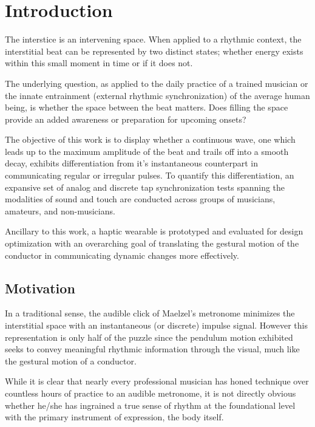 
\chapter{Introduction} \label{secIntro}
The interstice is an intervening space. When applied to a rhythmic context, the interstitial beat can be represented by two distinct states; whether energy exists within this small moment in time or if it does not. 

The underlying question, as applied to the daily practice of a trained musician or the innate entrainment (external rhythmic synchronization) of the average human being, is whether the space between the beat matters. Does filling the space provide an added awareness or preparation for upcoming onsets?

The objective of this work is to display whether a continuous wave, one which leads up to the maximum amplitude of the beat and trails off into a smooth decay, exhibits differentiation from it's instantaneous counterpart in communicating regular or irregular pulses. To quantify this differentiation, an expansive set of analog and discrete tap synchronization tests spanning the modalities of sound and touch are conducted across groups of musicians, amateurs, and non-musicians.

Ancillary to this work, a haptic wearable is prototyped and evaluated for design optimization with an overarching goal of translating the gestural motion of the conductor in communicating dynamic changes more effectively.

\section{Motivation}
In a traditional sense, the audible click of Maelzel's metronome minimizes the interstitial space with an instantaneous (or discrete) impulse signal. However this representation is only half of the puzzle since the pendulum motion exhibited seeks to convey meaningful rhythmic information through the visual, much like the gestural motion of a conductor.

While it is clear that nearly every professional musician has honed technique over countless hours of practice to an audible metronome, it is not directly obvious whether he/she has ingrained a true sense of rhythm at the foundational level with the primary instrument of expression, the body itself.

